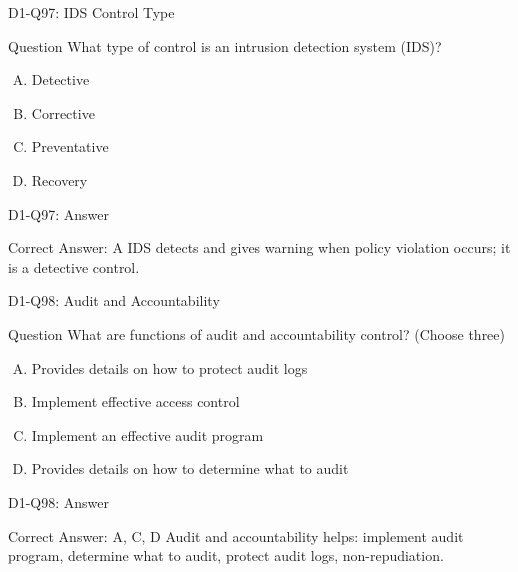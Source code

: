 \documentclass{beamer}
\begin{document}
	\begin{frame}{D1-Q97: IDS Control Type}
		\begin{block}{Question}
			What type of control is an intrusion detection system (IDS)?
		\end{block}
		\begin{enumerate}[(A)]
			\item Detective
			\item Corrective
			\item Preventative
			\item Recovery
		\end{enumerate}
	\end{frame}
	\begin{frame}{D1-Q97: Answer}
		\begin{block}{Correct Answer: A}
			IDS detects and gives warning when policy violation occurs; it is a detective control.
		\end{block}
	\end{frame}
	
	\begin{frame}{D1-Q98: Audit and Accountability}
		\begin{block}{Question}
			What are functions of audit and accountability control? (Choose three)
		\end{block}
		\begin{enumerate}[(A)]
			\item Provides details on how to protect audit logs
			\item Implement effective access control
			\item Implement an effective audit program
			\item Provides details on how to determine what to audit
		\end{enumerate}
	\end{frame}
	\begin{frame}{D1-Q98: Answer}
		\begin{block}{Correct Answer: A, C, D}
			Audit and accountability helps: implement audit program, determine what to audit, protect audit logs, non-repudiation.
		\end{block}
	\end{frame}
	
\end{document}
